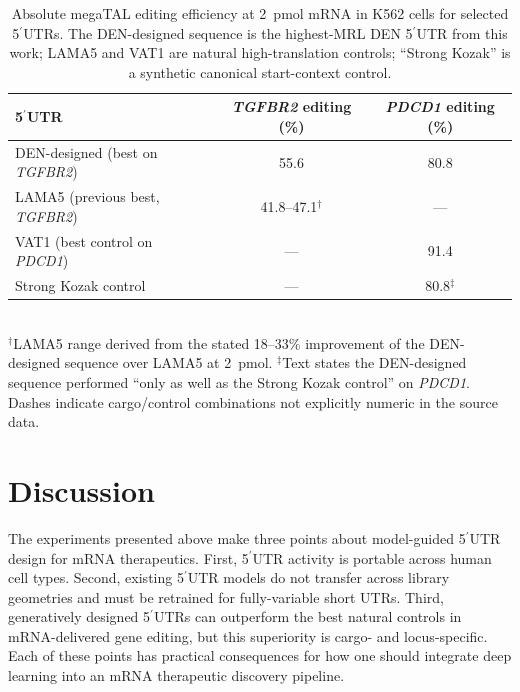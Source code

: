 \documentclass[11pt]{article}
\begin{document}
\begin{table}[htbp]
\centering
\caption{Absolute megaTAL editing efficiency at 2~pmol mRNA in K562
cells for selected 5$^\prime$UTRs. The DEN-designed sequence is the
highest-MRL DEN 5$^\prime$UTR from this work; LAMA5 and VAT1 are
natural high-translation controls; ``Strong Kozak'' is a synthetic
canonical start-context control.}
\label{tab:editing}
\begin{tabular}{lcc}
\toprule
5$^\prime$UTR & \emph{TGFBR2} editing (\%) & \emph{PDCD1} editing (\%) \\
\midrule
DEN-designed (best on \emph{TGFBR2}) & 55.6 & 80.8 \\
LAMA5 (previous best, \emph{TGFBR2}) & 41.8--47.1$^{\dagger}$ & --- \\
VAT1 (best control on \emph{PDCD1}) & --- & 91.4 \\
Strong Kozak control & --- & 80.8$^{\ddagger}$ \\
\bottomrule
\end{tabular}
\\[2pt]
{\footnotesize
$^{\dagger}$LAMA5 range derived from the stated 18--33\% improvement
of the DEN-designed sequence over LAMA5 at 2~pmol.
$^{\ddagger}$Text states the DEN-designed sequence performed
``only as well as the Strong Kozak control'' on \emph{PDCD1}.
Dashes indicate cargo/control combinations not explicitly numeric in
the source data.}
\end{table}

\section{Discussion}

The experiments presented above make three points about model-guided
5$^\prime$UTR design for mRNA therapeutics. First, 5$^\prime$UTR
activity is portable across human cell types. Second, existing
5$^\prime$UTR models do not transfer across library geometries and
must be retrained for fully-variable short UTRs. Third, generatively
designed 5$^\prime$UTRs can outperform the best natural controls in
mRNA-delivered gene editing, but this superiority is cargo- and
locus-specific. Each of these points has practical consequences for
how one should integrate deep learning into an mRNA therapeutic
discovery pipeline.
\end{document}
